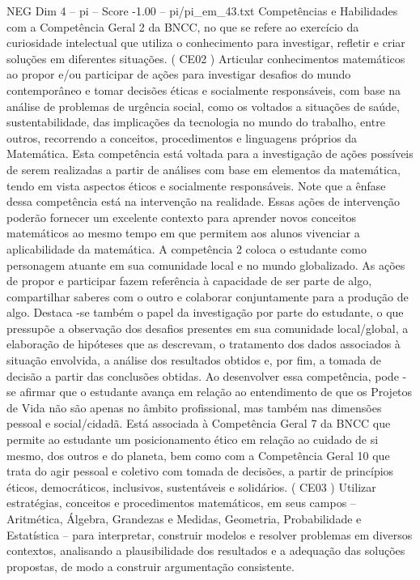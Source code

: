 \begin{textsample}{NEG Dim 4 – pi – Score -1.00 – pi/pi\_em\_43.txt}  \label{ex:f4_neg_167}
Competências e Habilidades com a Competência Geral 2 da BNCC, no que se refere ao exercício da curiosidade intelectual que utiliza o conhecimento para investigar, refletir e criar soluções em diferentes situações. ( CE02 ) Articular conhecimentos matemáticos ao propor e/ou participar de ações para investigar desafios do mundo contemporâneo e tomar decisões éticas e socialmente responsáveis, com base na análise de problemas de urgência social, como os voltados a situações de saúde, sustentabilidade, das implicações da tecnologia no mundo do trabalho, entre outros, recorrendo a conceitos, procedimentos e linguagens próprios da Matemática.
Esta competência está voltada para a investigação de ações possíveis de serem realizadas a partir de análises com base em elementos da matemática, tendo em vista aspectos éticos e socialmente responsáveis.
Note que a ênfase dessa competência está na intervenção na realidade.
Essas ações de intervenção poderão fornecer um excelente contexto para aprender novos conceitos matemáticos ao mesmo tempo em que permitem aos alunos vivenciar a aplicabilidade da matemática.
A competência 2 coloca o estudante como personagem atuante em sua comunidade local e no mundo globalizado.
As ações de propor e participar fazem referência à capacidade de ser parte de algo, compartilhar saberes com o outro e colaborar conjuntamente para a produção de algo.
Destaca -se também o papel da investigação por parte do estudante, o que pressupõe a observação dos desafios presentes em sua comunidade local/global, a elaboração de hipóteses que as descrevam, o tratamento dos dados associados à situação envolvida, a análise dos resultados obtidos e, por fim, a tomada de decisão a partir das conclusões obtidas.
Ao desenvolver essa competência, pode -se afirmar que o estudante avança em relação ao entendimento de que os Projetos de Vida não são apenas no âmbito profissional, mas também nas dimensões pessoal e social/cidadã.
Está associada à Competência Geral 7 da BNCC que permite ao estudante um posicionamento ético em relação ao cuidado de si mesmo, dos outros e do planeta, bem como com a Competência Geral 10 que trata do agir pessoal e coletivo com tomada de decisões, a partir de princípios éticos, democráticos, inclusivos, sustentáveis e solidários. ( CE03 ) Utilizar estratégias, conceitos e procedimentos matemáticos, em seus campos – Aritmética, Álgebra, Grandezas e Medidas, Geometria, Probabilidade e Estatística – para interpretar, construir modelos e resolver problemas em diversos contextos, analisando a plausibilidade dos resultados e a adequação das soluções propostas, de modo a construir argumentação consistente.

\end{textsample}
